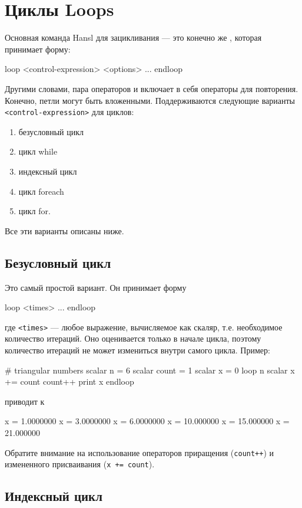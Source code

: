 \section{Циклы Loops}
\label{sec:hr-loops}

Основная команда Hansl для зацикливания --- это конечно же ,
которая принимает форму:
\begin{code}
loop <control-expression> <options>
    ...
endloop
\end{code}
Другими словами, пара операторов  и  включает в
себя операторы для повторения. Конечно, петли могут быть
вложенными. Поддерживаются следующие варианты
\texttt{<control-expression>} для циклов:
\begin{enumerate}
\item безусловный цикл
\item цикл while
\item индексный цикл
\item цикл foreach
\item цикл for.
\end{enumerate}
Все эти варианты описаны ниже. 

\subsection{Безусловный цикл}

Это самый простой вариант. Он принимает форму
\begin{code}
loop <times>
   ...
endloop
\end{code}
где \texttt{<times>} --- любое выражение, вычисляемое как скаляр,
т.е. необходимое количество итераций. Оно оценивается только в начале
цикла, поэтому количество итераций не может измениться внутри самого
цикла. Пример:
\begin{code}
# triangular numbers
scalar n = 6
scalar count = 1
scalar x = 0
loop n
    scalar x += count
    count++
    print x
endloop
\end{code}
приводит к
\begin{code}
              x =  1.0000000
              x =  3.0000000
              x =  6.0000000
              x =  10.000000
              x =  15.000000
              x =  21.000000
\end{code}

Обратите внимание на использование операторов приращения
(\texttt{count++}) и измененного присваивания (\texttt{x += count}).

\subsection{Индексный цикл}

